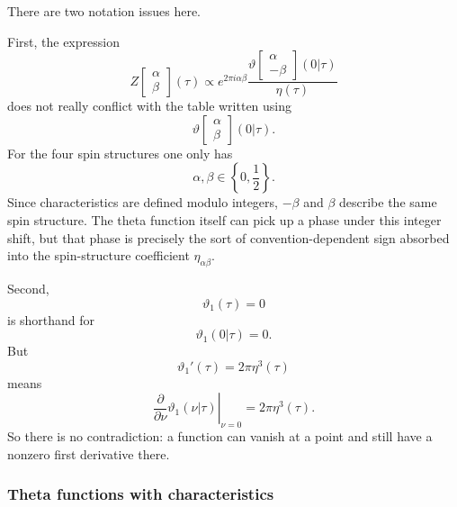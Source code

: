 \documentclass[
  10pt,
  a4paper,
  openany]{book}
\begin{document}
There are two notation issues here.

First, the expression \[
Z\begin{bmatrix}
\alpha\\
\beta
\end{bmatrix}(\tau)
\propto
e^{2\pi i\alpha\beta}
\frac{
\vartheta\begin{bmatrix}
\alpha\\
-\beta
\end{bmatrix}(0|\tau)}
{\eta(\tau)}
\] does not really conflict with the table written using \[
\vartheta\begin{bmatrix}
\alpha\\
\beta
\end{bmatrix}(0|\tau).
\] For the four spin structures one only has \[
\alpha,\beta\in\left\{0,\frac{1}{2}\right\}.
\] Since characteristics are defined modulo integers, \(-\beta\) and
\(\beta\) describe the same spin structure. The theta function itself
can pick up a phase under this integer shift, but that phase is
precisely the sort of convention-dependent sign absorbed into the
spin-structure coefficient \(\eta_{\alpha\beta}\).

Second, \[
\vartheta_1(\tau)=0
\] is shorthand for \[
\vartheta_1(0|\tau)=0.
\] But \[
\vartheta_1'(\tau)=2\pi\eta^3(\tau)
\] means \[
\left.\frac{\partial}{\partial \nu}\vartheta_1(\nu|\tau)\right|_{\nu=0}
=
2\pi\eta^3(\tau).
\] So there is no contradiction: a function can vanish at a point and
still have a nonzero first derivative there.

\subsubsection{Theta functions with
characteristics}\label{theta-functions-with-characteristics}
\end{document}
